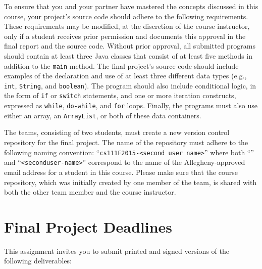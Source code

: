 To ensure that you and your partner have mastered the concepts discussed in this course, your project's source code
should adhere to the following requirements. These requirements may be modified, at the discretion of the course
instructor, only if a student receives prior permission and documents this approval in the final report and the source
code. Without prior approval, all submitted programs should contain at least three Java classes that consist of at least
five methods in addition to the {\tt main} method. The final project's source code should include examples of the
declaration and use of at least three different data types (e.g., {\tt int}, {\tt String}, and {\tt boolean}). The
program should also include conditional logic, in the form of {\tt if} or {\tt switch} statements, and one or more
iteration constructs, expressed as {\tt while}, {\tt do-while}, and {\tt for} loops. Finally, the programs must also use
either an array, an {\tt ArrayList}, or both of these data containers.

The teams, consisting of two students, must create a new version control repository for the final project.  The name of
the repository must adhere to the following naming convention: ``{\tt cs111F2015-<second user
  name>}'' where both ``{\tt <first-user-name>}'' and ``{\tt <second\-user-name>}'' correspond to the name of the
Allegheny-approved email address for a student in this course. Please make sure that the course repository, which was
initially created by one member of the team, is shared with both the other team member and the course instructor.

\section*{Final Project Deadlines}

This assignment invites you to submit printed and signed versions of the following deliverables:

